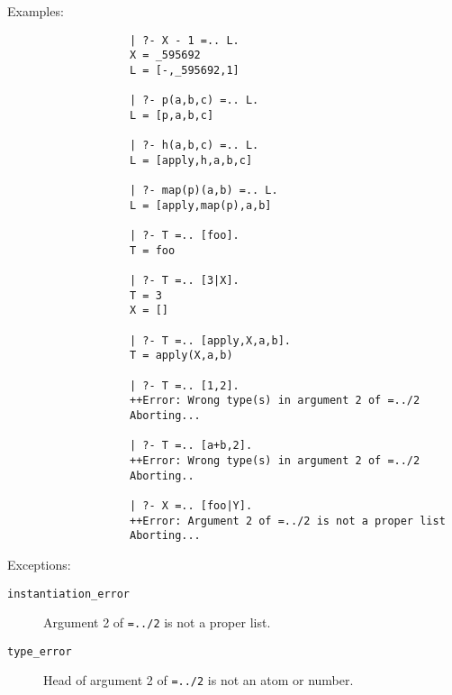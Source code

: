 \begin{description}
    Examples:
    {\footnotesize
     \begin{verbatim}
                   | ?- X - 1 =.. L.
                   X = _595692
                   L = [-,_595692,1]

                   | ?- p(a,b,c) =.. L.
                   L = [p,a,b,c]

                   | ?- h(a,b,c) =.. L.
                   L = [apply,h,a,b,c]

                   | ?- map(p)(a,b) =.. L.
                   L = [apply,map(p),a,b]

                   | ?- T =.. [foo].
                   T = foo

                   | ?- T =.. [3|X].
                   T = 3
                   X = []

                   | ?- T =.. [apply,X,a,b].
                   T = apply(X,a,b)

                   | ?- T =.. [1,2].
                   ++Error: Wrong type(s) in argument 2 of =../2
                   Aborting...

                   | ?- T =.. [a+b,2].
                   ++Error: Wrong type(s) in argument 2 of =../2
                   Aborting..

                   | ?- X =.. [foo|Y].
                   ++Error: Argument 2 of =../2 is not a proper list
                   Aborting...
     \end{verbatim}}

     Exceptions:
     \begin{description}
     \item[{\tt instantiation\_error}]
	Argument 2 of {\tt =../2} is not a proper list.
     \item[{\tt type\_error}]
	Head of argument 2 of {\tt =../2} is not an atom or number.
     \end{description}



\end{description}
